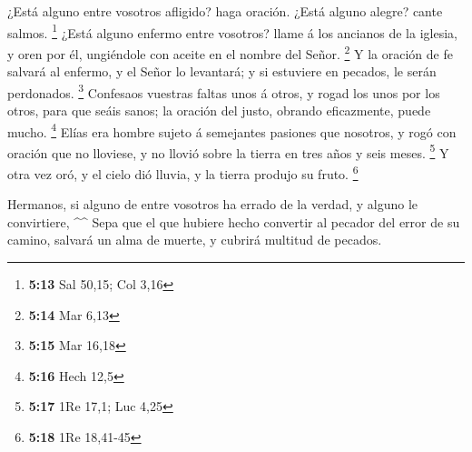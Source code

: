  ¿Está alguno entre vosotros afligido? haga oración. ¿Está
alguno alegre? cante salmos. \footnote{\textbf{5:13} Sal 50,15; Col 3,16}
 ¿Está alguno enfermo entre vosotros? llame á los ancianos
de la iglesia, y oren por él, ungiéndole con aceite en el nombre del
Señor. \footnote{\textbf{5:14} Mar 6,13}  Y la oración de
fe salvará al enfermo, y el Señor lo levantará; y si estuviere en
pecados, le serán perdonados. \footnote{\textbf{5:15} Mar 16,18}
 Confesaos vuestras faltas unos á otros, y rogad los unos
por los otros, para que seáis sanos; la oración del justo, obrando
eficazmente, puede mucho. \footnote{\textbf{5:16} Hech 12,5}
 Elías era hombre sujeto á semejantes pasiones que
nosotros, y rogó con oración que no lloviese, y no llovió sobre la
tierra en tres años y seis meses. \footnote{\textbf{5:17} 1Re 17,1; Luc
  4,25}  Y otra vez oró, y el cielo dió lluvia, y la tierra
produjo su fruto. \footnote{\textbf{5:18} 1Re 18,41-45}

 Hermanos, si alguno de entre vosotros ha errado de la
verdad, y alguno le convirtiere, \^{}\^{}  Sepa que el que
hubiere hecho convertir al pecador del error de su camino, salvará un
alma de muerte, y cubrirá multitud de pecados.
